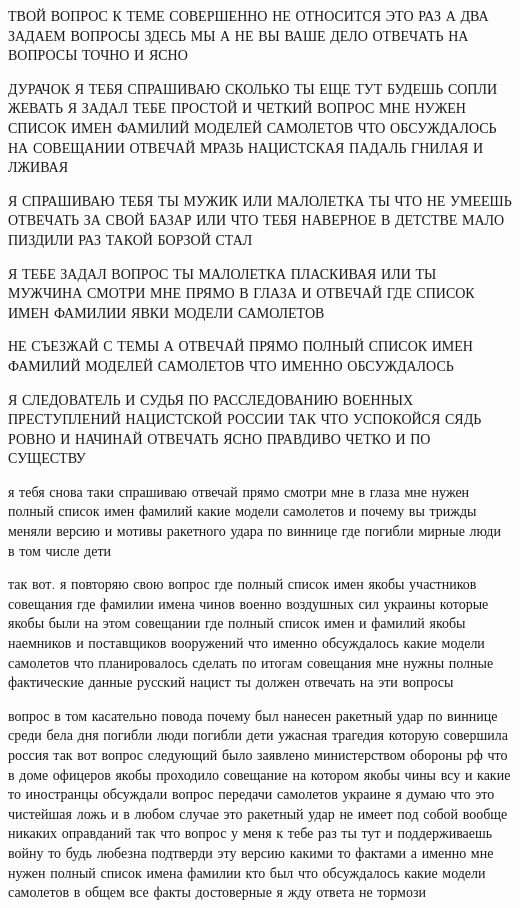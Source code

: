  
 
 
 
 

ТВОЙ ВОПРОС К ТЕМЕ СОВЕРШЕННО НЕ ОТНОСИТСЯ ЭТО РАЗ А ДВА ЗАДАЕМ ВОПРОСЫ ЗДЕСЬ
МЫ А НЕ ВЫ ВАШЕ ДЕЛО ОТВЕЧАТЬ НА ВОПРОСЫ ТОЧНО И ЯСНО

ДУРАЧОК Я ТЕБЯ СПРАШИВАЮ СКОЛЬКО ТЫ ЕЩЕ ТУТ БУДЕШЬ СОПЛИ ЖЕВАТЬ Я ЗАДАЛ ТЕБЕ
ПРОСТОЙ И ЧЕТКИЙ ВОПРОС МНЕ НУЖЕН СПИСОК ИМЕН ФАМИЛИЙ МОДЕЛЕЙ САМОЛЕТОВ ЧТО
ОБСУЖДАЛОСЬ НА СОВЕЩАНИИ ОТВЕЧАЙ МРАЗЬ НАЦИСТСКАЯ ПАДАЛЬ ГНИЛАЯ И ЛЖИВАЯ

Я СПРАШИВАЮ ТЕБЯ ТЫ МУЖИК ИЛИ МАЛОЛЕТКА ТЫ ЧТО НЕ УМЕЕШЬ ОТВЕЧАТЬ ЗА СВОЙ БАЗАР
ИЛИ ЧТО ТЕБЯ НАВЕРНОЕ В ДЕТСТВЕ МАЛО ПИЗДИЛИ РАЗ ТАКОЙ БОРЗОЙ СТАЛ

Я ТЕБЕ ЗАДАЛ ВОПРОС ТЫ МАЛОЛЕТКА ПЛАСКИВАЯ ИЛИ ТЫ МУЖЧИНА СМОТРИ МНЕ ПРЯМО В
ГЛАЗА И ОТВЕЧАЙ ГДЕ СПИСОК ИМЕН ФАМИЛИИ ЯВКИ МОДЕЛИ САМОЛЕТОВ

НЕ СЪЕЗЖАЙ С ТЕМЫ А ОТВЕЧАЙ ПРЯМО ПОЛНЫЙ СПИСОК ИМЕН ФАМИЛИЙ МОДЕЛЕЙ САМОЛЕТОВ
ЧТО ИМЕННО ОБСУЖДАЛОСЬ

Я СЛЕДОВАТЕЛЬ И СУДЬЯ ПО РАССЛЕДОВАНИЮ ВОЕННЫХ ПРЕСТУПЛЕНИЙ НАЦИСТСКОЙ РОССИИ
ТАК ЧТО УСПОКОЙСЯ СЯДЬ РОВНО И НАЧИНАЙ ОТВЕЧАТЬ ЯСНО ПРАВДИВО ЧЕТКО И ПО
СУЩЕСТВУ

я тебя снова таки спрашиваю отвечай прямо смотри мне в глаза мне нужен полный
список имен фамилий какие модели самолетов и почему вы трижды меняли версию и
мотивы ракетного удара по виннице где погибли мирные люди в том числе дети

так вот. я повторяю свою вопрос где полный список имен якобы участников
совещания где фамилии имена чинов военно воздушных сил украины которые якобы
были на этом совещании где полный список имен и фамилий якобы наемников и
поставщиков вооружений что именно обсуждалось какие модели самолетов что
планировалось сделать по итогам совещания мне нужны полные фактические данные
русский нацист ты должен отвечать на эти вопросы

вопрос в том касательно повода почему был нанесен ракетный удар по виннице
среди бела дня погибли люди погибли дети ужасная трагедия которую совершила
россия так вот вопрос следующий было заявлено министерством обороны рф что в
доме офицеров якобы проходило совещание на котором якобы чины всу и какие то
иностранцы обсуждали вопрос передачи самолетов украине я думаю что это
чистейшая ложь и в любом случае это ракетный удар не имеет под собой
вообще никаких оправданий так что вопрос у меня к тебе раз ты тут и поддерживаешь войну то
будь любезна подтверди эту версию какими то фактами а именно мне нужен полный
список имена фамилии кто был что обсуждалось какие модели самолетов в общем все
факты достоверные я жду ответа не тормози


